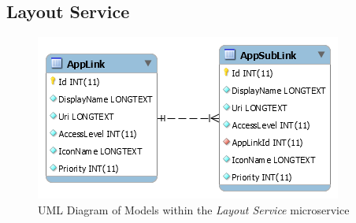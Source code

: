 \subsection{Layout Service}
\begin{figure}[H]
    \centering
    \includegraphics[width=\textwidth]{Images/db_uml/layout-service.png}
    \caption{UML Diagram of Models within the \textit{Layout Service} microservice}
    \label{fig:db_uml:layout-service}
\end{figure}

